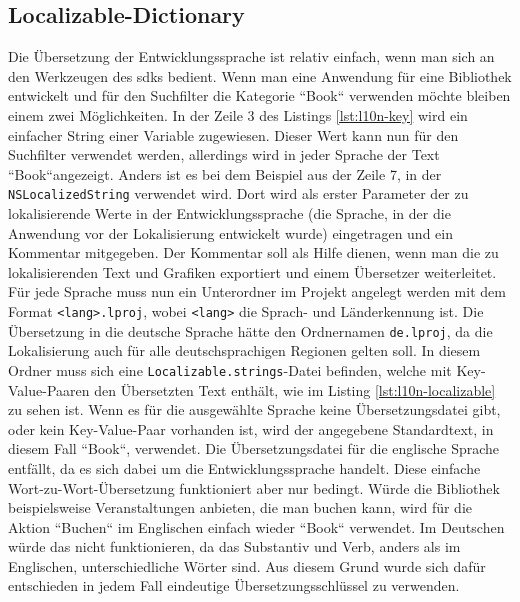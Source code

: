 \subsection{Localizable-Dictionary}
Die Übersetzung der Entwicklungssprache ist relativ einfach, wenn man sich an den Werkzeugen des \Glspl{sdk} bedient.
Wenn man eine Anwendung für eine Bibliothek entwickelt und für den Suchfilter die Kategorie ``Book`` verwenden möchte bleiben einem zwei Möglichkeiten.
In der Zeile 3 des Listings \ref{lst:l10n-key} wird ein einfacher String einer Variable zugewiesen.
Dieser Wert kann nun für den Suchfilter verwendet werden, allerdings wird in jeder Sprache der Text ``Book``angezeigt.
Anders ist es bei dem Beispiel aus der Zeile 7, in der \texttt{NSLocalizedString} verwendet wird.
Dort wird als erster Parameter der zu lokalisierende Werte in der Entwicklungssprache (die Sprache, in der die Anwendung vor der Lokalisierung entwickelt wurde) eingetragen und ein Kommentar mitgegeben.
Der Kommentar soll als Hilfe dienen, wenn man die zu lokalisierenden Text und Grafiken exportiert und einem Übersetzer weiterleitet.\pbreak%
%
Für jede Sprache muss nun ein Unterordner im Projekt angelegt werden mit dem Format \texttt{<lang>.lproj}, wobei \texttt{<lang>} die Sprach- und Länderkennung ist.
Die Übersetzung in die deutsche Sprache hätte den Ordnernamen \texttt{de.lproj}, da die Lokalisierung auch für alle deutschsprachigen Regionen gelten soll.
In diesem Ordner muss sich eine \texttt{Localizable.strings}-Datei befinden, welche mit Key-Value-Paaren den Übersetzten Text enthält, wie im Listing \ref{lst:l10n-localizable} zu sehen ist.
Wenn es für die ausgewählte Sprache keine Übersetzungsdatei gibt, oder kein Key-Value-Paar vorhanden ist, wird der angegebene Standardtext, in diesem Fall ``Book``, verwendet. Die Übersetzungsdatei für die englische Sprache entfällt, da es sich dabei um die Entwicklungssprache handelt.\pbreak%
%
Diese einfache Wort-zu-Wort-Übersetzung funktioniert aber nur bedingt.
Würde die Bibliothek beispielsweise Veranstaltungen anbieten, die man buchen kann, wird für die Aktion ``Buchen`` im Englischen einfach wieder ``Book`` verwendet.
Im Deutschen würde das nicht funktionieren, da das Substantiv und Verb, anders als im Englischen, unterschiedliche Wörter sind.
Aus diesem Grund wurde sich dafür entschieden in jedem Fall eindeutige Übersetzungsschlüssel zu verwenden.
